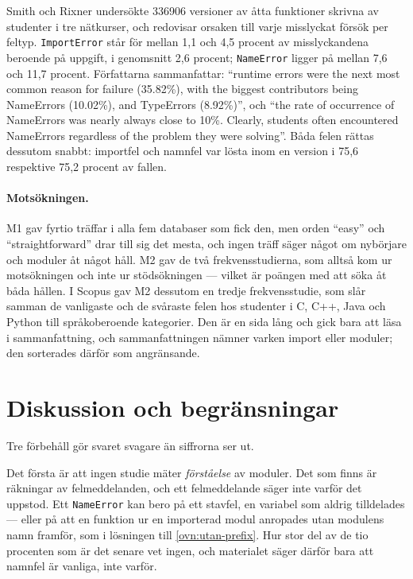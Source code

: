 Smith och Rixner undersökte \num{336906} versioner av åtta funktioner
skrivna av studenter i tre nätkurser, och redovisar orsaken till varje
misslyckat försök per feltyp.  \texttt{ImportError} står
för mellan 1,1 och 4,5 procent av misslyckandena beroende på uppgift,
i genomsnitt 2,6 procent; \texttt{NameError} ligger på
mellan 7,6 och 11,7 procent\autocite[tabell~3, s.~540]{SmithRixner2019}.
Författarna sammanfattar: \enquote{runtime errors were the next most
common reason for failure (35.82\%), with the biggest contributors being
NameErrors (10.02\%), and TypeErrors (8.92\%)}, och \enquote{the rate of
occurrence of NameErrors was nearly always close to 10\%.  Clearly,
students often encountered NameErrors regardless of the problem they
were solving}\autocite[541]{SmithRixner2019}.  Båda felen rättas
dessutom snabbt: importfel och namnfel var lösta inom en version i 75,6
respektive 75,2 procent av fallen\autocite[541]{SmithRixner2019}.

\paragraph{Motsökningen.}
M1 gav fyrtio träffar i alla fem databaser som fick den, men orden \enquote{easy} och
\enquote{straightforward} drar till sig det mesta, och ingen träff säger
något om nybörjare och moduler åt något håll.  M2 gav de två
frekvensstudierna, som alltså kom ur motsökningen och inte ur
stödsökningen --- vilket är poängen med att söka åt båda hållen.  I
Scopus gav M2 dessutom en tredje frekvensstudie, som slår samman de
vanligaste och de svåraste felen hos studenter i C, C++, Java och Python
till språkoberoende kategorier\autocite{Chandarana2023}.  Den är en
sida lång och gick bara att läsa i sammanfattning, och sammanfattningen
nämner varken import eller moduler; den sorterades därför som
angränsande.

\section{Diskussion och begränsningar}
\label{sec:mod-diskussion}

Tre förbehåll gör svaret svagare än siffrorna ser ut.

Det första är att ingen studie mäter \emph{förståelse} av moduler.  Det
som finns är räkningar av felmeddelanden, och ett felmeddelande säger
inte varför det uppstod.  Ett \texttt{NameError} kan bero på
ett stavfel, en variabel som aldrig tilldelades --- eller på att en
funktion ur en importerad modul anropades utan modulens namn framför,
som i lösningen till \cref{ovn:utan-prefix}.  Hur stor del av de tio
procenten som är det senare vet ingen, och materialet säger därför bara
att namnfel är vanliga, inte varför.

